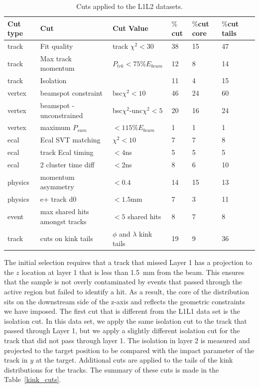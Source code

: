 \begin{table}[H]
\caption{Cuts applied to the L1L2 datasets.}
\label{l1l2_cuts}
\centering
\begin{tabular}{lllllll}
\toprule
Cut type & Cut & Cut Value &  $\%$cut &  $\%$cut core & $\%$cut tails\\
\midrule
track & Fit quality & track $\chi^{2}<30$ & 38 & 15 & 47 \\
track & Max track momentum &  $P_{trk}<75\%E_{beam}$ & 12 & 8 & 14 \\
track & Isolation &   & 11 & 4 & 15 \\
vertex & beamspot constraint & bsc$\chi^{2}<10$  & 46 & 24 & 60 \\
vertex & beamspot - unconstrained & bsc$\chi^{2}$-unc$\chi^2<5$  & 20 & 16 & 24 \\
vertex & maximum $P_{sum}$ &  $<115\%E_{beam}$ & 1 & 1 & 1 \\
ecal & Ecal SVT matching & $\chi^2<10$  & 7 & 7 & 8 \\
ecal & track Ecal timing & $<4$ns  & 5 & 5 & 5 \\
ecal & 2 cluster time diff & $<2$ns  & 8 & 6 & 10 \\
physics & momentum asymmetry & $<0.4$  & 14 & 15 & 13 \\
physics & e+ track d0 & $<1.5$mm  & 7 & 3 & 11 \\
event & max shared hits amongst tracks & $<5$ shared hits  & 8 & 7 & 8 \\
track & cuts on kink tails & $\phi$ and $\lambda$ kink tails & 19 & 9 & 36 \\
\bottomrule
\end{tabular}
\end{table}

The initial selection requires that a track that missed Layer 1 has a projection to the $z$ location at layer 1 that is less than 1.5~mm from the beam. This ensures that the sample is not overly contaminated by events that passed through the active region but failed to identify a hit. As a result, the core of the distribution sits on the downstream side of the z-axis and reflects the geometric constraints we have imposed. The first cut that is different from the L1L1 data set is the isolation cut. In this data set, we apply the same isolation cut to the track that passed through Layer 1, but we apply a slightly different isolation cut for the track that did not pass through layer 1. The isolation in layer 2 is measured and projected to the target position to be compared with the impact parameter of the track in $y$ at the target. Additional cuts are applied to the tails of the kink distributions for the tracks. The summary of these cuts is made in the Table~\ref{kink_cuts}.

